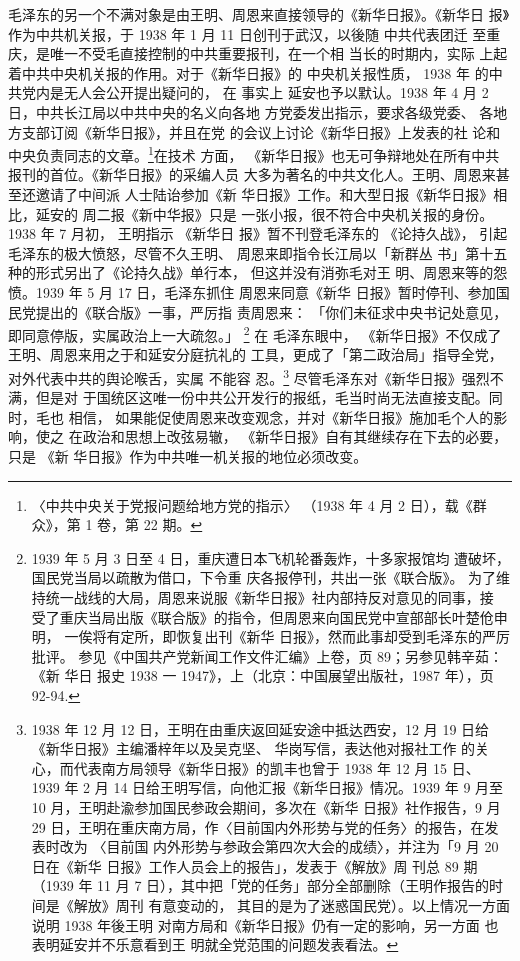 毛泽东的另一个不满对象是由王明、周恩来直接领导的《新华日报》。《新华日
报》作为中共机关报，于 1938 年 1 月 11 日创刊于武汉，以後随 中共代表团迁
至重庆，是唯一不受毛直接控制的中共重要报刊，在一个相 当长的时期内，实际
上起着中共中央机关报的作用。对于《新华日报》的 中央机关报性质， 1938 年
的中共党内是无人会公开提出疑问的， 在 事实上 延安也予以默认。1938 年 4
月 2 日，中共长江局以中共中央的名义向各地 方党委发出指示，要求各级党委、
各地方支部订阅《新华日报》，并且在党 的会议上讨论《新华日报》上发表的社
论和中央负责同志的文章。\footnote{〈中共中央关于党报问题给地方党的指示〉
（1938 年 4 月 2 日），载《群众》，第 1 卷，第 22 期。}在技术 方面，
《新华日报》也无可争辩地处在所有中共报刊的首位。《新华日报》的采编人员
大多为著名的中共文化人。王明、周恩来甚至还邀请了中间派 人士陆诒参加《新
华日报》工作。和大型日报《新华日报》相比，延安的 周二报《新中华报》只是
一张小报，很不符合中央机关报的身份。1938 年 7 月初， 王明指示 《新华日
报》暂不刊登毛泽东的 《论持久战》， 引起毛泽东的极大愤怒，尽管不久王明、
周恩来即指令长江局以「新群丛 书」第十五种的形式另出了《论持久战》单行本，
但这并没有消弥毛对王 明、周恩来等的怨愤。1939 年 5 月 17 日，毛泽东抓住
周恩来同意《新华 日报》暂时停刊、参加国民党提出的《联合版》一事，严厉指
责周恩来： 「你们未征求中央书记处意见，即同意停版，实属政治上一大疏忽。」
\footnote{1939 年 5 月 3 日至 4 日，重庆遭日本飞机轮番轰炸，十多家报馆均
遭破坏，国民党当局以疏散为借口，下令重 庆各报停刊，共出一张《联合版》。
为了维持统一战线的大局，周恩来说服《新华日报》社内部持反对意见的同事，接
受了重庆当局出版《联合版》的指令，但周恩来向国民党中宣部部长叶楚伧申明，
一俟将有定所，即恢复出刊《新华 日报》，然而此事却受到毛泽东的严厉批评。
参见《中国共产党新闻工作文件汇编》上卷，页 89；另参见韩辛茹： 《新 华日
报史 1938 一 1947》，上（北京：中国展望出版社，1987 年），页 92-94. }
在 毛泽东眼中， 《新华日报》不仅成了王明、周恩来用之于和延安分庭抗礼的
工具，更成了「第二政治局」指导全党，对外代表中共的舆论喉舌，实属 不能容
忍。\footnote{1938 年 12 月 12 日，王明在由重庆返回延安途中抵达西安，12
月 19 日给《新华日报》主编潘梓年以及吴克坚、 华岗写信，表达他对报社工作
的关心，而代表南方局领导《新华日报》的凯丰也曾于 1938 年 12 月 15 日、
1939 年 2 月 14 日给王明写信，向他汇报《新华日报》情况。1939 年 9 月至
10 月，王明赴渝参加国民参政会期间，多次在《新华 日报》社作报告，9 月 29
日，王明在重庆南方局，作〈目前国内外形势与党的任务〉的报告，在发表时改为
〈目前国 内外形势与参政会第四次大会的成绩〉，并注为「9 月 20 日在《新华
日报》工作人员会上的报告」，发表于《解放》周 刊总 89 期（1939 年 11 月
7 日），其中把「党的任务」部分全部删除（王明作报告的时间是《解放》周刊
有意变动的， 其目的是为了迷惑国民党）。以上情况一方面说明 1938 年後王明
对南方局和《新华日报》仍有一定的影响，另一方面 也表明延安并不乐意看到王
明就全党范围的问题发表看法。} 尽管毛泽东对《新华日报》强烈不满，但是对
于国统区这唯一份中共公开发行的报纸，毛当时尚无法直接支配。同时，毛也
相信， 如果能促使周恩来改变观念，并对《新华日报》施加毛个人的影响，使之
在政治和思想上改弦易辙， 《新华日报》自有其继续存在下去的必要，只是 《新
华日报》作为中共唯一机关报的地位必须改变。

